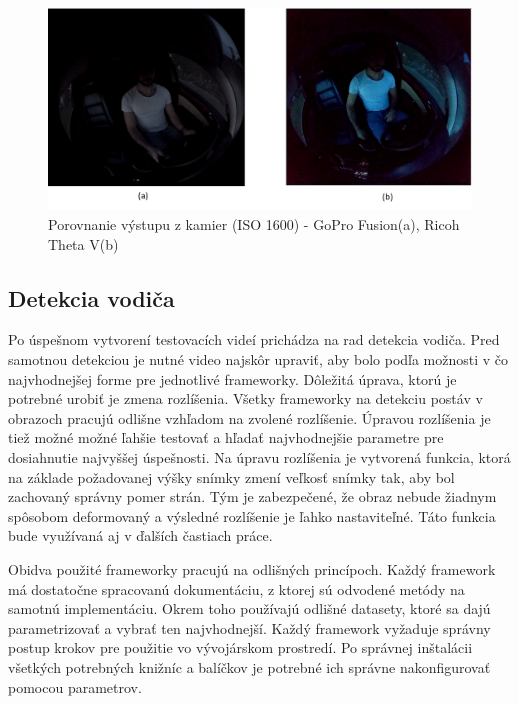 \documentclass[slovak,master,dept460,male,cpp,cpdeclaration]{diploma}
\begin{document}
\begin{figure}[H]
	\centering
	\includegraphics[width=1\textwidth]{Figures/camCompare.png}
	\caption{Porovnanie výstupu z kamier (ISO 1600) - GoPro Fusion(a), Ricoh Theta V(b)}
	\label{fig:cameraCompare}
\end{figure}

\newpage
\subsection{Detekcia vodiča}
\label{sec:driverDetection}
Po úspešnom vytvorení testovacích videí prichádza na rad detekcia vodiča. Pred samotnou detekciou je nutné video najskôr upraviť, aby bolo podľa možnosti v čo najvhodnejšej forme pre jednotlivé frameworky. Dôležitá úprava, ktorú je potrebné urobiť je zmena rozlíšenia. Všetky frameworky na detekciu postáv v obrazoch pracujú odlišne vzhľadom na zvolené rozlíšenie. Úpravou rozlíšenia je tiež možné možné ľahšie testovať a hľadať najvhodnejšie parametre pre dosiahnutie  najvyššej úspešnosti. Na úpravu rozlíšenia je vytvorená funkcia, ktorá na základe požadovanej výšky  snímky  zmení veľkosť  snímky tak, aby bol zachovaný správny pomer strán. Tým je zabezpečené, že obraz nebude žiadnym spôsobom deformovaný a výsledné rozlíšenie je ľahko nastaviteľné. Táto funkcia bude využívaná aj v ďalších častiach práce.\par
Obidva použité frameworky pracujú na odlišných princípoch.  Každý framework má  dostatočne spracovanú dokumentáciu, z ktorej sú odvodené metódy na samotnú implementáciu. Okrem toho používajú odlišné datasety, ktoré sa dajú parametrizovať a vybrať ten najvhodnejší. Každý framework  vyžaduje správny postup krokov pre použitie vo vývojárskom prostredí. Po správnej inštalácii všetkých potrebných knižníc a balíčkov  je potrebné ich správne nakonfigurovať pomocou parametrov.
\end{document}
